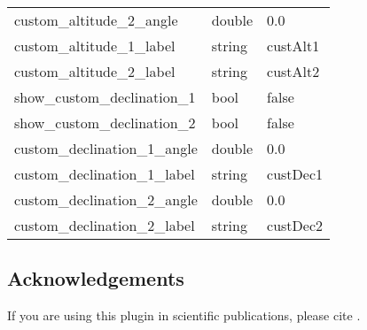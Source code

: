 \begin{longtable}{l|l|l}
custom\_altitude\_2\_angle     &double      & 0.0      \\
custom\_altitude\_1\_label     &string      & custAlt1 \\
custom\_altitude\_2\_label     &string      & custAlt2 \\\midrule
show\_custom\_declination\_1   &bool        & false    \\
show\_custom\_declination\_2   &bool        & false    \\
custom\_declination\_1\_angle  &double      & 0.0      \\
custom\_declination\_1\_label  &string      & custDec1 \\
custom\_declination\_2\_angle  &double      & 0.0      \\
custom\_declination\_2\_label  &string      & custDec2 \\\bottomrule
\end{longtable}

\subsection{Acknowledgements}

If you are using this plugin in scientific publications, please cite \citet{Zotti:SEAC2015}.



